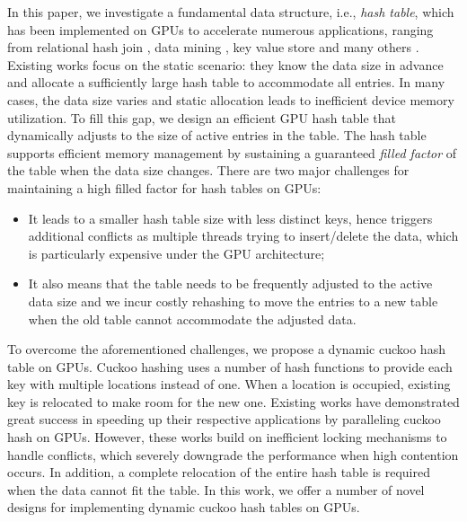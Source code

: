 In this paper, we investigate a fundamental data structure, i.e., \emph{hash table}, which has been implemented on GPUs to accelerate numerous applications, ranging from relational hash join \cite{he2008relational,he2009relational,heimel2013hardware}, data mining \cite{pan2011fast,zhou2010parallel,zhong2014medusa},  key value store \cite{zhang2015mega,hetherington2015memcachedgpu,breslow2016horton} and many others \cite{bowers2010parallel,pan2010efficient,garcia2011coherent,niessner2013real,wu2015gpu}. Existing works \cite{alcantara2009real,zhang2015mega,hong2010mapcg,hetherington2015memcachedgpu,breslow2016horton} focus on the static scenario: they know the data size in advance and allocate a sufficiently large hash table to accommodate all entries. In many cases, the data size varies and static allocation leads to inefficient device memory utilization. To fill this gap, we design an efficient GPU hash table that dynamically adjusts to the size of active entries in the table. The hash table supports efficient memory management by sustaining a guaranteed \emph{filled factor} of the table when the data size changes. There are two major challenges for maintaining a high filled factor for hash tables on GPUs:
\begin{itemize}
	\item It leads to a smaller hash table size with less distinct keys, hence triggers additional conflicts as multiple threads trying to insert/delete the data, which is particularly expensive under the GPU architecture;
	\item It also means that the table needs to be frequently adjusted to the active data size and we incur costly rehashing to move the entries to a new table when the old table cannot accommodate the adjusted data. 
\end{itemize}

To overcome the aforementioned challenges, we propose a dynamic cuckoo hash table on GPUs. Cuckoo hashing \cite{pagh2004cuckoo} uses a number of hash functions to provide each key with multiple locations instead of one. When a location is occupied, existing key is relocated to make room for the new one. Existing works \cite{alcantara2009real,alcantara2011building,zhang2015mega,breslow2016horton} have demonstrated great success in speeding up their respective applications by paralleling cuckoo hash on GPUs. However, these works build on inefficient locking mechanisms to handle conflicts, which severely downgrade the performance when high contention occurs. In addition, a complete relocation of the entire hash table is required when the data cannot fit the table. In this work, we offer a number of novel designs for implementing dynamic cuckoo hash tables on GPUs. 

